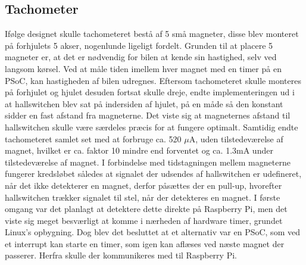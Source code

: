 \subsection{Tachometer}\label{sec:hwi_tacho}

Ifølge designet skulle tachometeret bestå af 5 små magneter, disse blev monteret på forhjulets 5 akser, nogenlunde ligeligt fordelt. 
Grunden til at placere 5 magneter er, at det er nødvendig for bilen at kende sin hastighed, selv ved langsom kørsel. 
Ved at måle tiden imellem hver magnet med en timer på en PSoC, kan hastigheden af bilen udregnes.
Eftersom tachometeret skulle monteres på forhjulet og hjulet desuden fortsat skulle dreje, endte implementeringen ud i at hallswitchen \cite{lib:TLE4905L} blev sat på indersiden af hjulet, på en måde så den konstant sidder en fast afstand fra magneterne. 
Det viste sig at magneternes afstand til hallswitchen skulle være særdeles præcis for at fungere optimalt. 
Samtidig endte tachometeret samlet set med at forbruge ca. 520 $\mu$A, uden tilstedeværelse af magnet, hvilket er ca. faktor 10 mindre end forventet og ca. 1.3mA under tilstedeværelse af magnet. 
I forbindelse med tidstagningen mellem magneterne fungerer kredsløbet således at signalet der udsendes af hallswitchen er udefineret, når det ikke detekterer en magnet, derfor påsættes der en pull-up, hvorefter hallswitchen trækker signalet til stel, når der detekteres en magnet. I første omgang var det planlagt at detektere dette direkte på Raspberry Pi, men det viste sig meget besværligt at komme i nærheden af hardware timer, grundet Linux's opbygning. Dog blev det besluttet at et alternativ var en PSoC, som ved et interrupt kan starte en timer, som igen kan aflæses ved næste magnet der passerer. Herfra skulle der kommunikeres med \IIC til Raspberry Pi. 
 